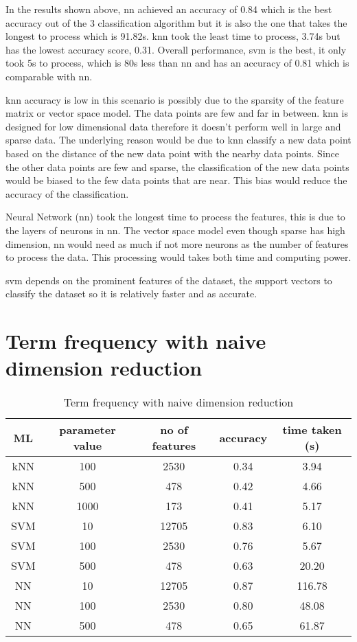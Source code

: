 In the results shown above, \ac{nn} achieved an accuracy of 0.84 which is the best accuracy out of the 3 classification algorithm but it is also the one that takes the longest to process which is 91.82s. \Ac{knn} took the least time to process, 3.74s but has the lowest accuracy score, 0.31. Overall performance, \ac{svm} is the best, it only took 5s to process, which is 80s less than \ac{nn} and has an accuracy of 0.81 which is comparable with \ac{nn}. 

\Ac{knn} accuracy is low in this scenario is possibly due to the sparsity of the feature matrix or vector space model. The data points are few and far in between. \Ac{knn} is designed for low dimensional data therefore it doesn't perform well in large and sparse data. The underlying reason would be due to \ac{knn} classify a new data point based on the distance of the new data point with the nearby data points. Since the other data points are few and sparse, the classification of the new data points would be biased to the few data points that are near. This bias would reduce the accuracy of the classification. \cite{knnDrawback}

Neural Network (\ac{nn}) took the longest time to process the features, this is due to the layers of neurons in \ac{nn}. The vector space model even though sparse has high dimension, \ac{nn} would need as much if not more neurons as the number of features to process the data. This processing would takes both time and computing power.

\Ac{svm} depends on the prominent features of the dataset, the support vectors to classify the dataset so it is relatively faster and as accurate.

\clearpage
\section{Term frequency with naive dimension reduction}

\begin{table} [ht]
	\centering
	\begin{tabular}{|| c | c | c | c | c||}
		\hline
		ML & parameter value & no of features & accuracy & time taken (s) \\ [0.5ex]
		\hline\hline
		kNN & 100 & 2530 & 0.34 & 3.94 \\ 
		\hline
		kNN & 500 & 478 & 0.42 & 4.66 \\ 
		\hline
		kNN & 1000 & 173 & 0.41 & 5.17 \\ 
		\hline\hline
		SVM & 10 & 12705 & 0.83 & 6.10 \\
		\hline
		SVM & 100 & 2530 & 0.76 & 5.67 \\
		\hline
		SVM & 500 & 478 & 0.63 & 20.20 \\
		\hline\hline
		NN & 10 & 12705 & 0.87 & 116.78 \\
		\hline
		NN & 100 & 2530 & 0.80 & 48.08 \\
		\hline
		NN & 500 & 478 & 0.65 & 61.87 \\
		\hline
	\end{tabular}
\caption{Term frequency with naive dimension reduction}
\label{tbl:termFrequencyNaive}
\end{table}

